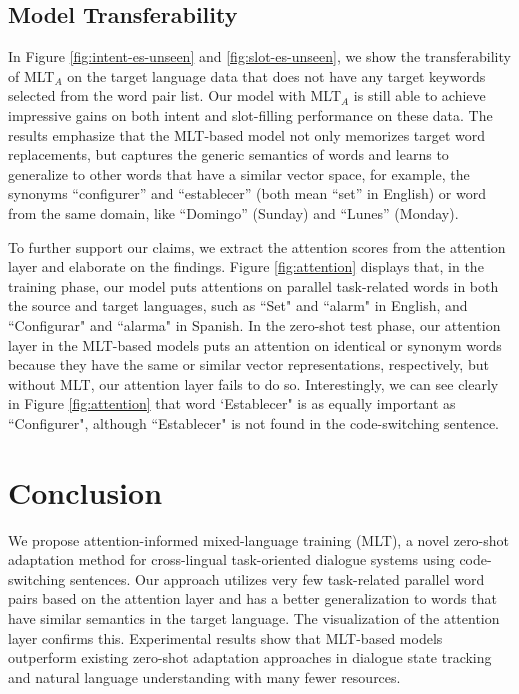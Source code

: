 \documentclass[letterpaper]{article} %
\begin{document}
\subsection{Model Transferability}
In Figure \ref{fig:intent-es-unseen} and \ref{fig:slot-es-unseen}, we show the transferability of MLT$_A$ on the target language data that does not have any target keywords selected from the word pair list. Our model with MLT$_A$ is still able to achieve impressive gains on both intent and slot-filling performance on these data. The results emphasize that the MLT-based model not only memorizes target word replacements, but captures the generic semantics of words and learns to generalize to other words that have a similar vector space, for example, the synonyms ``configurer'' and ``establecer'' (both mean ``set'' in English) or word from the same domain, like ``Domingo'' (Sunday) and ``Lunes'' (Monday).

To further support our claims, we extract the attention scores from the attention layer and elaborate on the findings. Figure \ref{fig:attention} displays that, in the training phase, our model puts attentions on parallel task-related words in both the source and target languages, such as ``Set" and ``alarm" in English, and ``Configurar" and ``alarma" in Spanish. In the zero-shot test phase, our attention layer in the MLT-based models puts an attention on identical or synonym words because they have the same or similar vector representations, respectively, but without MLT, our attention layer fails to do so.
Interestingly, we can see clearly in Figure \ref{fig:attention} that word `Establecer" is as equally important as ``Configurer", although ``Establecer" is not found in the code-switching sentence.

\section{Conclusion}
We propose attention-informed mixed-language training (MLT), a novel zero-shot adaptation method for cross-lingual task-oriented dialogue systems using code-switching sentences. Our approach utilizes very few task-related parallel word pairs based on the attention layer and has a better generalization to words that have similar semantics in the target language. The visualization of the attention layer confirms this. Experimental results show that MLT-based models outperform existing zero-shot adaptation approaches in dialogue state tracking and natural language understanding with many fewer resources.




\end{document}
